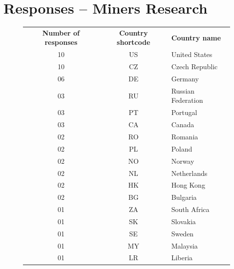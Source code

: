 \documentclass[
  printed, %
  table,   %
  lof,     %
  lot,     %
           oneside, color
]{fithesis3}
\begin{document}
\chapter{Responses -- Miners Research}
\vspace{-2em}
\begin{figure}[H]
\center
\begin{tabular}{ccl}
\textbf{Number of responses} & \textbf{Country shortcode} & \textbf{Country name} \\
10                           & US                         & United States         \\
10                           & CZ                         & Czech Republic        \\
06                            & DE                         & Germany               \\
03                            & RU                         & Russian Federation    \\
03                            & PT                         & Portugal              \\
03                            & CA                         & Canada                \\
02                            & RO                         & Romania               \\
02                            & PL                         & Poland                \\
02                            & NO                         & Norway                \\
02                            & NL                         & Netherlands           \\
02                            & HK                         & Hong Kong             \\
02                            & BG                         & Bulgaria              \\
01                            & ZA                         & South Africa          \\
01                            & SK                         & Slovakia              \\
01                            & SE                         & Sweden                \\
01                            & MY                         & Malaysia              \\
01                            & LR                         & Liberia               \\

\end{tabular}
\end{figure}
\end{document}
